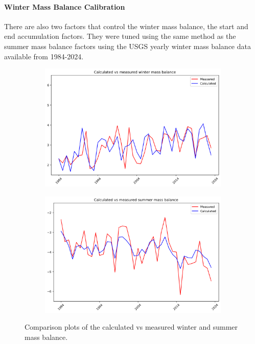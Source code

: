 \documentclass{article}
\begin{document}
\paragraph{Winter Mass Balance Calibration}
There are also two factors that control the winter mass balance, the start and end accumulation factors. They were tuned using the same 
method as the summer mass balance factors using the USGS yearly winter mass balance data available from 1984-2024.
\begin{figure}[h]
    \centering
    \begin{subfigure}[b]{0.49\textwidth}
        \centering
        \includegraphics[width=\textwidth]{Plots/winter_mb_compare.png}
        \label{fig:winter_mb_compare}
    \end{subfigure}
    \hfill
    \begin{subfigure}[b]{0.49\textwidth}
        \centering
        \includegraphics[width=\textwidth]{Plots/summer_mb_compare.png}
        \label{fig:summer_mb_compare}
    \end{subfigure}
    \caption{Comparison plots of the calculated vs measured winter and summer mass balance.}
    \label{fig:mb_comparison}
\end{figure}
\FloatBarrier
\end{document}
